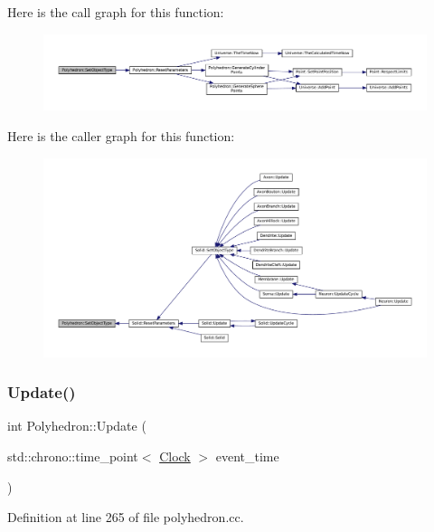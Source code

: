 Here is the call graph for this function\+:\nopagebreak
\begin{figure}[H]
\begin{center}
\leavevmode
\includegraphics[width=350pt]{class_polyhedron_a014c8f981aef5fa1d70dcb5be6a0875a_cgraph}
\end{center}
\end{figure}
Here is the caller graph for this function\+:\nopagebreak
\begin{figure}[H]
\begin{center}
\leavevmode
\includegraphics[width=350pt]{class_polyhedron_a014c8f981aef5fa1d70dcb5be6a0875a_icgraph}
\end{center}
\end{figure}
\mbox{\label{class_polyhedron_a5fdc8c91719799904b8a1ccef535a42c}} 
\subsubsection{\texorpdfstring{Update()}{Update()}}
{\footnotesize\ttfamily int Polyhedron\+::\+Update (\begin{DoxyParamCaption}\item[{std\+::chrono\+::time\+\_\+point$<$ \mbox{\hyperlink{universe_8h_a0ef8d951d1ca5ab3cfaf7ab4c7a6fd80}{Clock}} $>$}]{event\+\_\+time }\end{DoxyParamCaption})}



Definition at line 265 of file polyhedron.\+cc.

